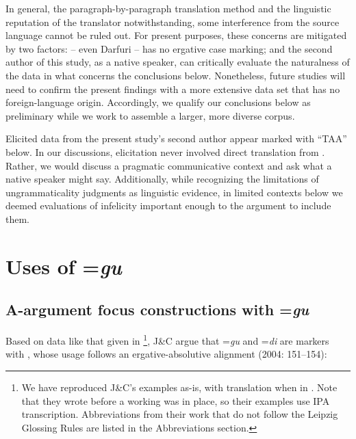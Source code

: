\documentclass[output=paper,modfonts]{langscibook}
\begin{document}
In general, the paragraph-by-paragraph translation method and the linguistic reputation of the translator notwithstanding, some interference from the source language cannot be ruled out. For present purposes, these concerns are mitigated by two factors:  – even Darfuri  – has no ergative case marking; and the second author of this study, as a native   speaker, can critically evaluate the naturalness of the data in what concerns the conclusions below. Nonetheless, future studies will need to confirm the present findings with a more extensive data set that has no foreign-language origin. Accordingly, we qualify our conclusions below as preliminary while we work to assemble a larger, more diverse corpus.

Elicited data from the present study’s second author appear marked with “TAA” below. In our discussions, elicitation never involved direct translation from . Rather, we would discuss a pragmatic communicative context and ask what a native  speaker might say. Additionally, while recognizing the limitations of ungrammaticality judgments as linguistic evidence, in limited contexts below we deemed evaluations of infelicity important enough to the argument to include them.


\section{Uses of =\textit{gu}}\label{sec:wolfe:3}
\subsection{A-argument focus constructions with =\textit{gu}}\label{sec:wolfe:3.1}
Based on data like that given in \footnote{We have reproduced J\&C’s examples as-is, with translation when in . Note that they wrote before a working  was in place, so their examples use IPA transcription. Abbreviations from their work that do not follow the Leipzig Glossing Rules are listed in the Abbreviations section.}, J\&C argue that =\textit{gu} and =\textit{di} are  markers with , whose usage follows an ergative-absolutive alignment (2004: 151--154):
\end{document}
